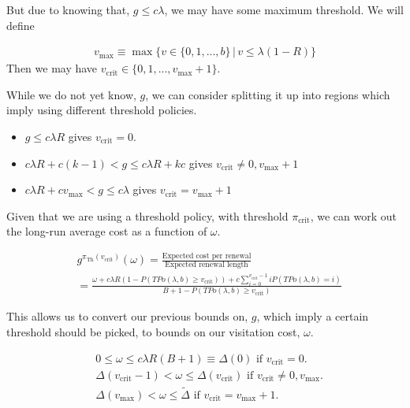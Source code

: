 \documentclass[a4paper,10pt]{article}
\theoremstyle{definition}
\theoremstyle{definition}
\theoremstyle{remark}
\theoremstyle{definition}
\begin{document}
But due to knowing that, $g \leq c \lambda$, we may have some maximum threshold. We will define

\begin{align*}
v_{\text{max}} \equiv \max \{ v \in \{0,1,...,b \} \, | \, v \leq \lambda (1-R) \}
\end{align*}
Then we may have $v_{\text{crit}} \in \{0,1,...,v_{\text{max}}+1 \}$.

While we do not yet know, $g$, we can consider splitting it up into regions which imply using different threshold policies.

\begin{itemize}
\item $g \leq c \lambda R$ gives $v_{\text{crit}}=0$.

\item $c \lambda R +c(k-1) < g \leq c \lambda R + kc$ gives $v_{\text{crit}} \neq 0,v_{\text{max}}+1$

\item $c \lambda R + c v_{\text{max}} < g \leq c \lambda$ gives $v_{\text{crit}}=v_{\text{max}}+1$
\end{itemize}

Given that we are using a threshold policy, with threshold $\pi_{\text{crit}}$, we can work out the long-run average cost as a function of $\omega$.

\begin{align*}
&g^{\pi_{\text{Th}}(v_{\text{crit}})}(\omega)=\frac{\text{Expected cost per renewal}}{\text{Expected renewal length}} \\
&= \frac{\omega + c \lambda R (1-P(TPo(\lambda,b) \geq v_{\text{crit}})) + c \sum\limits_{i=0}^{v_{\text{crit}}-1} i P(TPo(\lambda,b)=i)}{B+1-P(TPo(\lambda,b) \geq v_{\text{crit}})}
\end{align*}

This allows us to convert our previous bounds on, $g$, which imply a  certain threshold should be picked, to bounds on our visitation cost, $\omega$.

\begin{equation}
\begin{aligned}
&0 \leq \omega \leq c \lambda R (B+1) \equiv \Delta(0) \text{ if } v_{\text{crit}}=0. \\
&\Delta(v_{\text{crit}}-1) < \omega \leq  \Delta(v_{\text{crit}}) \text{ if } v_{\text{crit}} \neq 0,v_{\text{max}}. \\
&\Delta(v_{\text{max}}) < \omega \leq \widetilde{\Delta} \text{ if } v_{\text{crit}}=v_{\text{max}}+1.
\end{aligned}
\label{Equation:Omega equations}
\end{equation}
\end{document}

